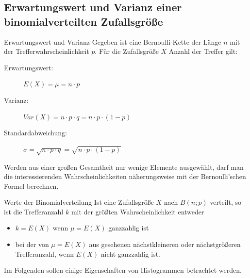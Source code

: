 \subsection{Erwartungswert und Varianz einer binomialverteilten Zufallsgröße}
    \begin{defi}{Erwartungswert und Varianz}{}
     Gegeben ist eine Bernoulli-Kette der Länge \(n\) mit der Trefferwahrscheinlichkeit \(p\). Für die Zufallsgröße \(X\) \glqq Anzahl der Treffer\grqq{} gilt:
     \begin{description}
         \item[Erwartungswert:] \(E(X) = \mu = n\cdot p\)
         \item[Varianz:] \(Var(X) = n\cdot p \cdot q = n\cdot p\cdot \left(1-p\right)\)
         \item[Standardabweichung:]\(\sigma = \sqrt{n\cdot p \cdot q } = \sqrt{n\cdot p\cdot \left(1-p\right)}\) 
     \end{description} 
    \end{defi}
    \begin{b8d}{}{}
Werden aus einer großen Gesamtheit nur wenige Elemente ausgewählt, darf man die interessierenden Wahrscheinlichkeiten näherungsweise mit der Bernoulli'schen Formel berechnen.
    \end{b8d}
    \begin{merke}{Werte der Binomialverteilung}{}
   Ist eine Zufallsgröße \(X\) nach \(B(n;p)\) verteilt, so ist die Trefferanzahl \(k\) mit der größten Wahrscheinlichkeit entweder \begin{itemize}
       \item \(k=E(X)\) wenn \(\mu = E(X)\) ganzzahlig ist
       \item bei der von \(\mu = E(X)\) aus gesehenen nächstkleineren oder nächstgrößeren Trefferanzahl, wenn \(E(X)\) nicht ganzzahlig ist.
   \end{itemize}
    \end{merke}
    Im Folgenden sollen einige Eigenschaften von Histogrammen betrachtet werden.

